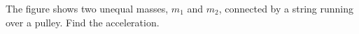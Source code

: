         The figure shows two unequal masses, $m_1$ and $m_2$, connected by
        a string running over a pulley. Find the acceleration.
        \answercheck
